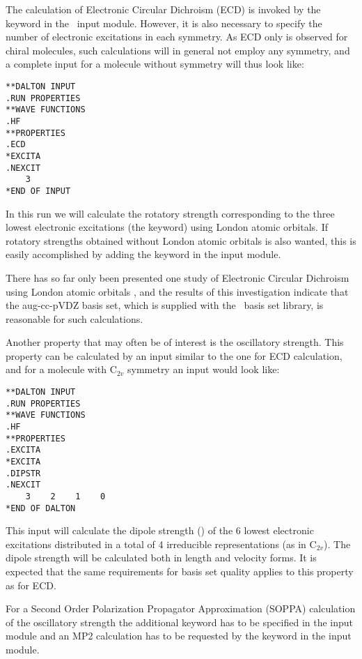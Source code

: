 The calculation of Electronic Circular Dichroism
(ECD) is invoked by 
the keyword  in the \aba\ input module. However,
it is also necessary to specify the number of electronic
excitations in 
each symmetry. As ECD only is observed for chiral molecules, such
calculations will in general not employ any symmetry, and a complete
input for a molecule without symmetry will thus look like:

\begin{verbatim}
**DALTON INPUT
.RUN PROPERTIES
**WAVE FUNCTIONS
.HF
**PROPERTIES
.ECD
*EXCITA
.NEXCIT
    3
*END OF INPUT
\end{verbatim}

In this run we will calculate the rotatory strength corresponding to 
the three lowest electronic excitations
(the  keyword) 
using London atomic orbitals. 
If rotatory strengths obtained without London atomic orbitals is also
wanted, this is easily accomplished by adding the keyword
 in the  input module.

There has so far only been presented one study of Electronic Circular
Dichroism using London atomic orbitals \cite{klbaehkrthjopjtca90}, and the
results of this investigation indicate that the aug-cc-pVDZ basis
set, which is supplied with the \siraba\ basis set library, is
reasonable for such calculations. 

Another property that may often be of interest is the
oscillatory strength. This property can be
calculated by an input 
similar to the one for ECD calculation, and for a molecule with
C$_{2v}$ symmetry an input would look like:

\begin{verbatim}
**DALTON INPUT
.RUN PROPERTIES
**WAVE FUNCTIONS
.HF
**PROPERTIES
.EXCITA
*EXCITA
.DIPSTR
.NEXCIT
    3    2    1    0
*END OF DALTON
\end{verbatim}

This input will calculate the dipole strength () of the
6 lowest electronic excitations distributed in a total of 4
irreducible representations (as in C$_{2v}$). The dipole strength will
be calculated both in 
length and velocity forms. It is expected that the same requirements
for basis set quality applies to this property as for ECD.

For a Second Order Polarization Propagator Approximation (SOPPA) 
\cite{esnpjjodjcp73,jodpjdycpr2,mjpekdtehjajjojcp} calculation of the 
oscillatory strength the additional keyword  has to be specified 
in the  
input module and an MP2 calculation has to be requested by the keyword 
 in the  input module. 

